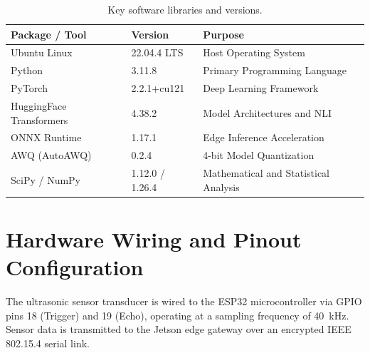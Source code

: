 \begin{table}[ht]
    \centering
    \caption{Key software libraries and versions.}
    \label{tab:software_deps}
    \small
    \begin{tabularx}{\textwidth}{llX}
        \toprule
        \textbf{Package / Tool} & \textbf{Version} & \textbf{Purpose} \\
        \midrule
        Ubuntu Linux & 22.04.4 LTS & Host Operating System \\
        Python & 3.11.8 & Primary Programming Language \\
        PyTorch & 2.2.1+cu121 & Deep Learning Framework \\
        HuggingFace Transformers & 4.38.2 & Model Architectures and NLI \\
        ONNX Runtime & 1.17.1 & Edge Inference Acceleration \\
        AWQ (AutoAWQ) & 0.2.4 & 4-bit Model Quantization \\
        SciPy / NumPy & 1.12.0 / 1.26.4 & Mathematical and Statistical Analysis \\
        \bottomrule
    \end{tabularx}
\end{table}

\section{Hardware Wiring and Pinout Configuration}
\label{sec:app_hardware_wiring}

The ultrasonic sensor transducer is wired to the ESP32 microcontroller via GPIO pins 18 (Trigger) and 19 (Echo), operating at a sampling frequency of \SI{40}{\kilo\hertz}. Sensor data is transmitted to the Jetson edge gateway over an encrypted IEEE 802.15.4 serial link.
